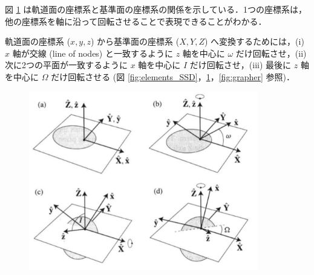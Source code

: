 \documentclass[11pt,a4paper,oneside,onecolumn]{jreport}
\begin{document}
図 \ref{fig:xyzXYZ} は軌道面の座標系と基準面の座標系の関係を示している．1つの座標系は，他の座標系を軸に沿って回転させることで表現できることがわかる．

軌道面の座標系 ($x, y, z$) から基準面の座標系 ($X, Y, Z$) へ変換するためには，(i) $x$ 軸が交線 (line of nodes) と一致するように $z$ 軸を中心に $\omega$ だけ回転させ，(ii) 次に2つの平面が一致するように $x$ 軸を中心に $I$ だけ回転させ，(iii) 最後に $z$ 軸を中心に $\Omega$ だけ回転させる (図 \ref{fig:elements_SSD}，\ref{fig:xyzXYZ}，\ref{fig:grapher} 参照)．

\begin{figure}[H]
\centering
\includegraphics[width=10cm]{./image/sec2_14.pdf}
\caption{\label{fig:xyzXYZ}}
\end{figure}
\end{document}

